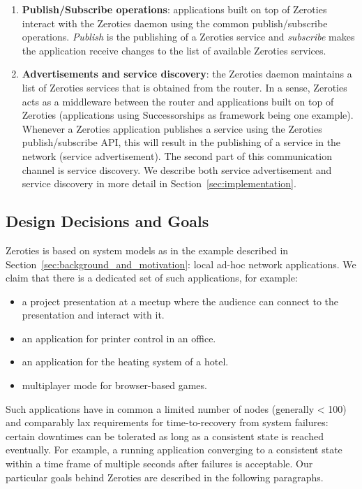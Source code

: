 \begin{enumerate}
\item \textbf{Publish/Subscribe operations}: applications built on top of Zeroties interact with the Zeroties daemon using the common publish/subscribe operations.
\textit{Publish} is the publishing of a Zeroties service and \textit{subscribe} makes the application receive changes to the list of available Zeroties services. 

\item \textbf{Advertisements and service discovery}: the Zeroties daemon maintains a list of Zeroties services that is obtained from the router.
In a sense, Zeroties acts as a middleware between the router and applications built on top of Zeroties (applications using Successorships as framework being one example). 
Whenever a Zeroties application publishes a service using the Zeroties publish/subscribe API, this will result in the publishing of a service in the network (service advertisement). 
The second part of this communication channel is service discovery.
We describe both service advertisement and service discovery in more detail in Section~\ref{sec:implementation}.
\end{enumerate}


\subsection{Design Decisions and Goals}
\label{sub:design}

Zeroties is based on system models as in the example described in Section~\ref{sec:background_and_motivation}: local ad-hoc network applications. We claim that there is a dedicated set of such applications, for example:
\begin{itemize}
\item a project presentation at a meetup where the audience can connect to the presentation and interact with it.
\item an application for printer control in an office.
\item an application for the heating system of a hotel.
\item multiplayer mode for browser-based games.
\end{itemize}

Such applications have in common a limited number of nodes (generally < 100) and comparably lax requirements for time-to-recovery from system failures: certain downtimes can be tolerated as long as a consistent state is reached eventually.
For example, a running application converging to a consistent state within a time frame of multiple seconds after failures is acceptable.
Our particular goals behind Zeroties are described in the following paragraphs.

